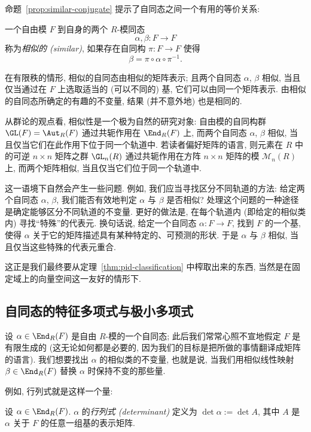 命题~\ref{prop:similar-conjugate} 提示了自同态之间一个有用的等价关系:

\begin{definition}\label{def:similar-endomorphisms}
一个自由模 $F$ 到自身的两个 $R$-模同态
\[
\alpha,\beta:F\longrightarrow F
\]
称为\emph{相似的 (similar)}, 如果存在自同构 $\pi:F\to F$ 使得
\[
\beta=\pi\circ\alpha\circ\pi^{-1}.
\]
\end{definition}

在有限秩的情形, 相似的自同态由相似的矩阵表示; 且两个自同态 $\alpha$, $\beta$ 相似, 当且仅当通过在 $F$ 上选取适当的 (可以不同的) 基, 它们可以由同一个矩阵表示. 由相似的自同态所确定的有趣的不变量, 结果 (并不意外地) 也是相同的.

从群论的观点看, 相似性是一个极为自然的研究对象: 自由模的自同构群 $\GL(F)=\Aut_R(F)$ 通过共轭作用在 $\End_R(F)$ 上, 而两个自同态 $\alpha$, $\beta$ 相似, 当且仅当它们在此作用下位于同一个轨道中. 若读者偏好矩阵的语言, 则元素在 $R$ 中的可逆 $n\times n$ 矩阵之群 $\GL_n(R)$ 通过共轭作用在方阵 $n\times n$ 矩阵的模 $\mathcal{M}_n(R)$ 上, 而两个矩阵相似, 当且仅当它们位于同一个轨道中.

这一语境下自然会产生一些问题. 例如, 我们应当寻找区分不同轨道的方法: 给定两个自同态 $\alpha$, $\beta$, 我们能否有效地判定 $\alpha$ 与 $\beta$ 是否相似? 处理这个问题的一种途径是确定能够区分不同轨道的不变量. 更好的做法是, 在每个轨道内 (即给定的相似类内) 寻找``特殊''的代表元. 换句话说, 给定一个自同态 $\alpha:F\to F$, 找到 $F$ 的一个基, 使得 $\alpha$ 关于它的矩阵描述具有某种特定的、可预测的形状. 于是 $\alpha$ 与 $\beta$ 相似, 当且仅当这些特殊的代表元重合.

这正是我们最终要从定理~\ref{thm:pid-classification} 中榨取出来的东西, 当然是在固定域上的向量空间这一友好的情形下.

\subsection{自同态的特征多项式与极小多项式}
\label{subsec:char-min-poly}

设 $\alpha\in\End_R(F)$ 是自由 $R$-模的一个自同态; 此后我们常常心照不宣地假定 $F$ 是有限生成的 (这无论如何都是必要的, 因为我们的目标是把所做的事情翻译成矩阵的语言). 我们想要找出 $\alpha$ 的相似类的不变量, 也就是说, 当我们用相似线性映射 $\beta\in\End_R(F)$ 替换 $\alpha$ 时保持不变的那些量.

例如, 行列式就是这样一个量:

\begin{definition}\label{def:det-endomorphism}
设 $\alpha\in\End_R(F)$. $\alpha$ 的\emph{行列式 (determinant)}
定义为 $\det\alpha:=\det A$, 其中 $A$ 是 $\alpha$ 关于 $F$ 的任意一组基的表示矩阵.
\end{definition}

